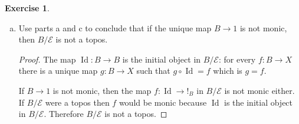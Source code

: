 \documentclass{article}
\DeclareMathOperator{\Id}{Id}
\newcommand{\cat}{\mathcal{C}}
\newcommand{\catt}{\mathcal{D}}
\newcommand{\cattt}{\mathcal{E}}
\newcommand{\topos}{\mathcal{E}}
\theoremstyle{definition}
\newtheorem{question}{Exercise}
\begin{document}
\begin{question}
\begin{enumerate}[(a)]
\begin{proof}
                  We now claim right adjoints preserve monos, and thus that
                  \(U\) does as well. This means that any mono \(\alpha\) in
                  \(B/\topos\) is mono in \(\topos\). Let
                  \(F:\cat\to\cattt\dashv G\) be two functors and \(f:X\to Y\)
                  in \(\cat\) a mono. Then for all \(Z\in\catt\) the map
                  \(\cat(1,f):\cat(FZ,X)\to\cat(FZ,Y)\) is injective. We have a
                  commutative diagram
                  \[
                      \begin{tikzcd}[ampersand replacement=\&]
                          \cat(FZ,X)\&\&\cat(FZ,Y)\\
                          \\
                          \cat(Z,GX)\&\&\cat(Z,GY)\\
                          \arrow["{\topos(1,f)}", from=1-1, to=1-3]
                          \arrow["{\topos(1,Gf)}", from=3-1, to=3-3]
                          \arrow["\sim" rot, from=1-1, to=3-1]
                          \arrow["\sim" rot, from=1-3, to=3-3]
                      \end{tikzcd}
                  \]
                  The top map is monic and the vertical maps are isomorphisms.
                  Therefore \(E(1,Gf)\) is monic which is the definition of
                  \(Gf\) monic.
              \end{proof}
        \item Use parts a and c to conclude that if the unique map \(B\to 1\) is
              not monic, then \(B/\topos\) is not a topos.

              \begin{proof}
                  The map \(\Id:B\to B\) is the initial object in \(B/\topos\):
                  for every \(f:B\to X\) there is a unique map \(g:B\to X\) such
                  that \(g\circ\Id =f\) which is \(g=f\).

                  If \(B\to 1\) is not monic, then the map \(f:\Id\to !_{B}\) in
                  \(B/\topos\) is not monic either. If \(B/\topos\) were a topos
                  then \(f\) would be monic because \(\Id\) is the initial
                  object in \(B/\topos\). Therefore \(B/\topos\) is not a topos.
              \end{proof}
    \end{enumerate}
\end{question}
\end{document}
